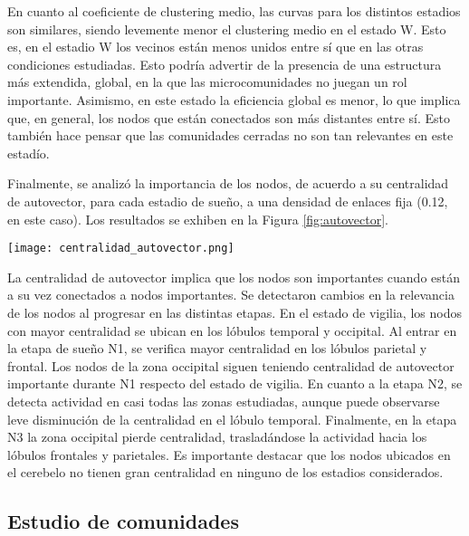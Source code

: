 \documentclass[a4paper,10pt,twocolumn,spanish]{article}
\begin{document}
En cuanto al coeficiente de clustering medio, las curvas para los distintos estadios son similares, siendo levemente menor el clustering medio en el estado W. Esto es, en el estadio W los vecinos están menos unidos entre sí que en las otras condiciones estudiadas. Esto podría advertir de la presencia de una estructura más extendida, global, en la que las microcomunidades no juegan un rol importante. Asimismo, en este estado la eficiencia global es menor, lo que implica que, en general, los nodos que están conectados son más distantes entre sí. Esto también hace pensar que las comunidades cerradas no son tan relevantes en este estadío.

Finalmente, se analizó la importancia de los nodos, de acuerdo a su centralidad de autovector, para cada estadio de sueño, a una densidad de enlaces fija (0.12, en este caso). Los resultados se exhiben en la Figura \ref{fig:autovector}. 

\begin{figure*}[htb]
\centering
\texttt{[image: centralidad\_autovector.png]}
\caption{Caracterización del grafo - Importancia de nodos según centralidad de autovector}
\label{fig:autovector}
\end{figure*}

La centralidad de autovector implica que los nodos son importantes cuando están a su vez conectados a nodos importantes. Se detectaron cambios en la relevancia de los nodos al progresar en las distintas etapas. En el estado de vigilia, los nodos con mayor centralidad se ubican en los lóbulos temporal y occipital. Al entrar en la etapa de sueño N1, se verifica mayor centralidad en los lóbulos parietal y frontal. Los nodos de la zona occipital siguen teniendo centralidad de autovector importante durante N1 respecto del estado de vigilia. En cuanto a la etapa N2, se detecta actividad en casi todas las zonas estudiadas, aunque puede observarse leve disminución de la centralidad en el lóbulo temporal. Finalmente, en la etapa N3 la zona occipital pierde centralidad, trasladándose la actividad hacia los lóbulos frontales y parietales. Es importante destacar que los nodos ubicados en el cerebelo no tienen gran centralidad en ninguno de los estadios considerados.

\subsection{Estudio de comunidades} \label{comunidades}
\end{document}
